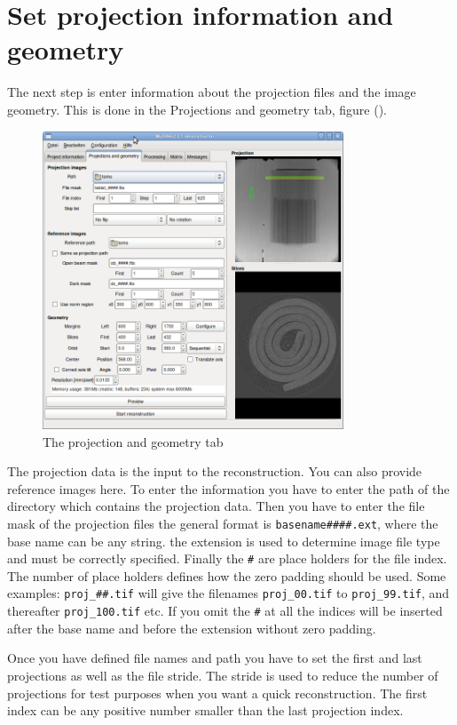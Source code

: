 \documentclass[a4paper]{scrreprt}
\begin{document}
\section{Set projection information and geometry}
The next step is enter information about the projection files and the image
geometry. This is done in the Projections and geometry tab, figure ().
\begin{figure}[ht!]
\centering
 \includegraphics[width=0.8\textwidth]{figures/ProjectionGeometry.png}
\caption{The projection and geometry tab}\label{fig_ProjectionGeometry}
\end{figure}


The projection data is the input to the reconstruction. You can also provide reference images here.
To enter the information you have to enter the path of the directory which contains the projection data.
Then you have to enter the file mask of the projection files the general format is \verb+basename####.ext+,
where the base name can be any string. the extension is used to determine image file type and must
be correctly specified. Finally the \verb+#+ are place holders for the file index. The number of
place holders defines how the zero padding should be used. Some examples: \verb+proj_##.tif+ will give
the filenames \verb+proj_00.tif+ to \verb+proj_99.tif+, and thereafter \verb+proj_100.tif+ etc.
If you omit the \verb+#+ at all the indices will be inserted after the base name and before the extension without zero padding.

Once you have defined file names and path you have to set the first and last projections as
well as the file stride. The stride is used to reduce the number of projections for test
purposes when you want a quick reconstruction. The first index can be any positive
number smaller than the last projection index.
\end{document}
